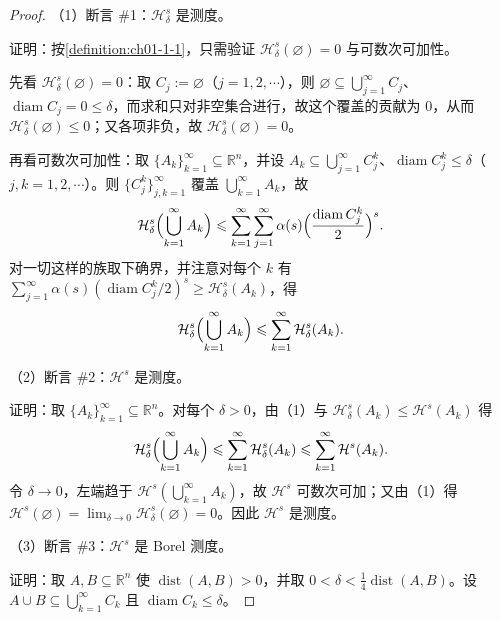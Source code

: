 \documentclass[../../main.tex]{subfiles}%
\begin{document}
\begin{proof}
（1）断言 \#1：$\mathcal{H}^s_\delta$ 是测度。

证明：按\cref{definition:ch01-1-1}，只需验证 $\mathcal{H}^s_\delta(\varnothing)=0$ 与可数次可加性。%

先看 $\mathcal{H}^s_\delta(\varnothing)=0$：取 $C_j:=\varnothing$（$j=1,2,\cdots$），则 $\varnothing\subseteq\bigcup_{j=1}^{\infty}C_j$、$\operatorname{diam}C_j=0\leqslant\delta$，而求和只对非空集合进行，故这个覆盖的贡献为 $0$，从而 $\mathcal{H}^s_\delta(\varnothing)\leqslant0$；又各项非负，故 $\mathcal{H}^s_\delta(\varnothing)=0$。

再看可数次可加性：取 $\{A_k\}_{k=1}^{\infty}\subseteq\mathbb{R}^n$，并设 $A_k\subseteq\bigcup_{j=1}^{\infty}C_j^k$、$\operatorname{diam}C_j^k\leqslant\delta$（$j,k=1,2,\cdots$）。则 $\{C_j^k\}_{j,k=1}^{\infty}$ 覆盖 $\bigcup_{k=1}^{\infty}A_k$，故
\begin{align*}
\mathcal{H}^s_\delta\Bigl(\bigcup_{k=1}^{\infty}A_k\Bigr)\leqslant\sum_{k=1}^{\infty}\sum_{j=1}^{\infty}\alpha(s)\Bigl(\frac{\operatorname{diam}C_j^k}{2}\Bigr)^s.
\end{align*}
对一切这样的族取下确界，并注意对每个 $k$ 有 $\sum_{j=1}^{\infty}\alpha(s)(\operatorname{diam}C_j^k/2)^s\geqslant\mathcal{H}^s_\delta(A_k)$，得
\begin{align*}
\mathcal{H}^s_\delta\Bigl(\bigcup_{k=1}^{\infty}A_k\Bigr)\leqslant\sum_{k=1}^{\infty}\mathcal{H}^s_\delta(A_k).
\end{align*}

（2）断言 \#2：$\mathcal{H}^s$ 是测度。

证明：取 $\{A_k\}_{k=1}^{\infty}\subseteq\mathbb{R}^n$。对每个 $\delta>0$，由（1）与 $\mathcal{H}^s_\delta(A_k)\leqslant\mathcal{H}^s(A_k)$ 得
\begin{align*}
\mathcal{H}^s_\delta\Bigl(\bigcup_{k=1}^{\infty}A_k\Bigr)\leqslant\sum_{k=1}^{\infty}\mathcal{H}^s_\delta(A_k)\leqslant\sum_{k=1}^{\infty}\mathcal{H}^s(A_k).
\end{align*}
令 $\delta\to0$，左端趋于 $\mathcal{H}^s(\bigcup_{k=1}^{\infty}A_k)$，故 $\mathcal{H}^s$ 可数次可加；又由（1）得 $\mathcal{H}^s(\varnothing)=\lim_{\delta\to0}\mathcal{H}^s_\delta(\varnothing)=0$。因此 $\mathcal{H}^s$ 是测度。

（3）断言 \#3：$\mathcal{H}^s$ 是 Borel 测度。

证明：取 $A,B\subseteq\mathbb{R}^n$ 使 $\operatorname{dist}(A,B)>0$，并取 $0<\delta<\frac14\operatorname{dist}(A,B)$。设 $A\cup B\subseteq\bigcup_{k=1}^{\infty}C_k$ 且 $\operatorname{diam}C_k\leqslant\delta$。


\end{proof}
\end{document}
